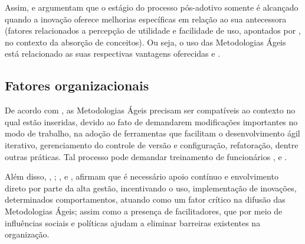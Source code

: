 Assim, \citeauthor{Senapathi2011} \citeyear{Senapathi2011} e \citeauthor{Senapathi2012} \citeyear{Senapathi2012} argumentam que o estágio do processo pós-adotivo somente é alcançado quando a inovação oferece melhorias específicas em relação ao sua antecessora (fatores relacionados a percepção de utilidade e facilidade de uso, apontados por \citeauthor{Bahli2011} \citeyear{Bahli2011}, no contexto da absorção de conceitos). Ou seja, o uso das Metodologias Ágeis está relacionado as suas respectivas vantagens oferecidas \citeauthor{Senapathi2011} \citeyear{Senapathi2011} e \citeauthor{Senapathi2012} \citeyear{Senapathi2012}.

\subsection{Fatores organizacionais}
De acordo com \citeauthor{Senapathi2014} \citeyear{Senapathi2014}, as Metodologias Ágeis precisam ser compatíveis ao contexto no qual estão inseridas, devido ao fato de demandarem modificações importantes no modo de trabalho, na adoção de ferramentas que facilitam o desenvolvimento ágil iterativo, gerenciamento do controle de versão e configuração, refatoração, dentre outras práticas. Tal processo pode demandar treinamento de funcionários \citeauthor{Lazwanthi2016} \citeyear{Lazwanthi2016}, \citeauthor{Pikkarainen2012} \citeyear{Pikkarainen2012} e \citeauthor{Solinski2016} \citeyear{Solinski2016}.

Além disso, \citeauthor{Senapathi2012} \citeyear{Senapathi2012}, \citeyear{Senapathi2014}; \citeauthor{Asnawi2012} \citeyear{Asnawi2012}, \citeauthor{Pikkarainen2012} \citeyear{Pikkarainen2012} e \citeauthor{Solinski2016} \citeyear{Solinski2016}, afirmam que é necessário apoio contínuo e envolvimento direto por parte da alta gestão, incentivando o uso, implementação de inovações, determinados comportamentos, atuando como um fator crítico na difusão das Metodologias Ágeis; assim como a presença de facilitadores, que por meio de influências sociais e políticas ajudam a eliminar barreiras existentes na organização.

